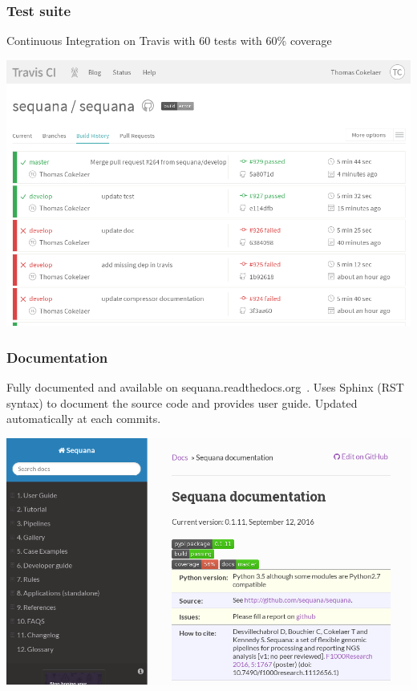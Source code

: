 \documentclass{beamer}
\begin{document}
\begin{frame}
    \frametitle{Test suite}
    \begin{block}{}
    Continuous Integration on Travis with 60 tests with 60\% coverage
    \end{block}
    
    
        \includegraphics[scale=0.35]{images/travis}
\end{frame}


\begin{frame}
    \frametitle{Documentation}
    Fully documented and available on sequana.readthedocs.org~.
    Uses Sphinx (RST syntax) to document the source code and provides user guide.
    Updated automatically at each commits.
\begin{center}
\includegraphics[scale=0.3]{images/rtd}
\end{center}
\end{frame}
\end{document}
